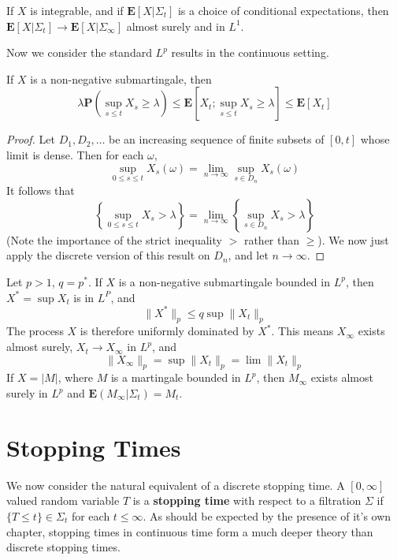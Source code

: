 \begin{theorem}
    If $X$ is integrable, and if $\mathbf{E}[X|\Sigma_t]$ is a \cadlag choice of conditional expectations, then $\mathbf{E}[X|\Sigma_t] \to \mathbf{E}[X|\Sigma_\infty]$ almost surely and in $L^1$.
\end{theorem}

Now we consider the standard $L^p$ results in the continuous setting.

\begin{theorem}
    If $X$ is a non-negative \cadlag submartingale, then
    \[ \lambda \mathbf{P} \left( \sup_{s \leq t} X_s \geq \lambda \right) \leq \mathbf{E} \left[X_t; \sup_{s \leq t} X_s \geq \lambda \right] \leq \mathbf{E}[X_t] \]
\end{theorem}
\begin{proof}
    Let $D_1, D_2, \dots$ be an increasing sequence of finite subsets of $[0,t]$ whose limit is dense. Then for each $\omega$,
    \[ \sup_{0 \leq s \leq t} X_s(\omega) = \lim_{n \to \infty} \sup_{s \in D_n} X_s(\omega) \]
    It follows that
    \[ \left\{ \sup_{0 \leq s \leq t} X_s > \lambda \right\} = \lim_{n \to \infty} \left\{ \sup_{s \in D_n} X_s > \lambda \right\} \]
    (Note the importance of the strict inequality $>$ rather than $\geq$). We now just apply the discrete version of this result on $D_n$, and let $n \to \infty$.
\end{proof}

\begin{theorem}
    Let $p > 1$, $q = p^*$. If $X$ is a non-negative \cadlag submartingale bounded in $L^p$, then $X^* = \sup X_t$ is in $L^P$, and
    \[ \| X^* \|_p \leq q \sup \| X_t \|_p \]
    The process $X$ is therefore uniformly dominated by $X^*$. This means $X_\infty$ exists almost surely, $X_t \to X_\infty$ in $L^p$, and
    \[ \|X_\infty \|_p = \sup \|X_t \|_p = \lim \| X_t \|_p \]
    If $X = |M|$, where $M$ is a \cadlag martingale bounded in $L^p$, then $M_\infty$ exists almost surely in $L^p$ and $\mathbf{E}(M_\infty|\Sigma_t) = M_t$.
\end{theorem}

\chapter{Stopping Times}

We now consider the natural equivalent of a discrete stopping time. A $[0,\infty]$ valued random variable $T$ is a {\bf stopping time} with respect to a filtration $\Sigma$ if $\{ T \leq t \} \in \Sigma_t$ for each $t \leq \infty$. As should be expected by the presence of it's own chapter, stopping times in continuous time form a much deeper theory than discrete stopping times.

